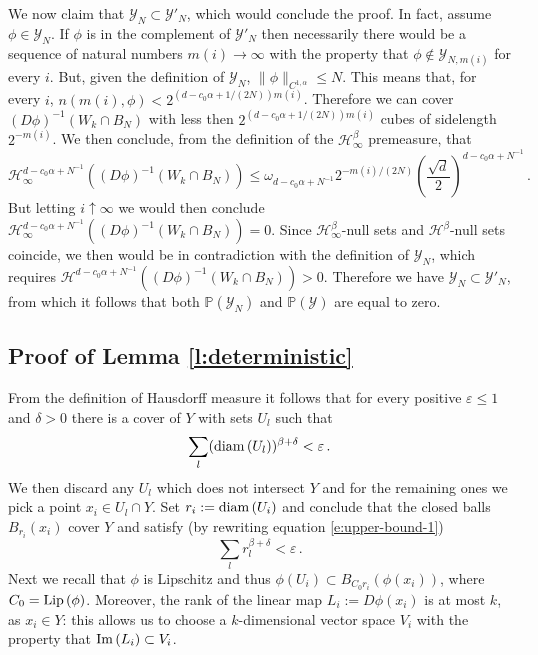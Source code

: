 \documentclass[11pt,reqno]{amsart}
\theoremstyle{definition}
\numberwithin{equation}{section}
\begin{document}
We now claim that $\mathcal{Y}_N\subset \mathcal{Y}'_N$, which would conclude the proof. In fact, assume $\phi \in \mathcal{Y}_N$. If $\phi$ is in the complement of $\mathcal{Y}'_N$ then necessarily there would be a sequence of natural numbers $m (i)\to\infty$ with the property that $\phi \not\in \mathcal{Y}_{N, m (i)}$ for every $i$. But, given the definition of $\mathcal{Y}_N$, $\|\phi\|_{C^{1,\alpha}}\leq N$. This means that, for every $i$, $n ( m (i), \phi) < 2^{(d-c_0\alpha+1/(2N)) m (i)}$. Therefore we can cover $(D\phi)^{-1} ( W_k \cap B_N)$ with less then $2^{(d-c_0\alpha+1/(2N)) m (i)}$ cubes of sidelength $2^{- m (i)}$. We then conclude, from the definition of the $\mathcal{H}^\beta_\infty$ premeasure, that 
\begin{equation}\label{e:final-bound}
\mathcal{H}^{d-c_0\alpha + N^{-1}}_\infty ((D\phi)^{-1} (W_k \cap B_N)) 
\leq \omega_{d-c_0\alpha+N^{-1}} 2^{- m (i)/(2N)} \left(\frac{\sqrt{d}}{2}\right)^{d-c_0\alpha+N^{-1}}\, .
\end{equation}
But letting $i\uparrow \infty$ we would then conclude $\mathcal{H}^{d-c_0\alpha+N^{-1}}_\infty ((D\phi)^{-1} (W_k \cap B_N)) =0 $. Since $\mathcal{H}^\beta_\infty$-null sets and $\mathcal{H}^\beta$-null sets coincide, we then would be in contradiction with the definition of $\mathcal{Y}_N$, which requires $\mathcal{H}^{d-c_0 \alpha+N^{-1}} ((D\phi)^{-1} (W_k \cap B_N))>0$.  Therefore we have $\mathcal{Y}_N\subset \mathcal{Y}'_N$, from which it follows that both $\mathbb{P} (\mathcal{Y}_N)$ and $\mathbb{P} (\mathcal{Y})$ are equal to zero.


\subsection{Proof of Lemma \ref{l:deterministic}} 
From the definition of Hausdorff measure it follows that for every positive $\varepsilon \leq 1$ and $\delta>0$ there is a cover of $Y$ with sets $U_{l}$ such that 
\begin{equation} \label{e:upper-bound-1}
\sum_{l} ({\rm diam}\, (U_{l}))^{\beta+\delta} < \varepsilon\, .
\end{equation}
We then discard any $U_{l}$ which does not intersect $Y$ and for the remaining ones we pick a point $x_i\in U_{l} \cap Y$. Set $r_i := {\rm diam}\, (U_i)$ and conclude that the closed balls $B_{r_i} (x_i)$ cover $Y$ and satisfy (by rewriting equation \eqref{e:upper-bound-1})
\begin{equation}\label{e:upper-bound-2}
\sum_l r_l^{\beta+\delta} < \varepsilon\, .
\end{equation}
Next we recall that $\phi$ is Lipschitz and thus $\phi (U_i) \subset B_{C_0 r_i} (\phi (x_i))$, where $C_0 = {\rm Lip}\, (\phi)$. Moreover, the rank of the linear map $L_i := D\phi (x_i)$ is at most $k$, as $x_i \in Y$: this allows us to choose a $k$-dimensional vector space $V_i$ with the property that ${\rm Im}\, (L_i) \subset V_i$. 
\end{document}
